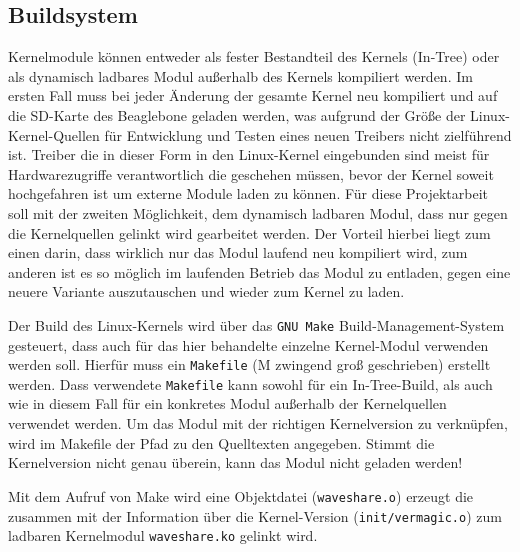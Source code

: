 \subsection{Buildsystem}
Kernelmodule können entweder als fester Bestandteil des Kernels (In-Tree) oder als dynamisch ladbares Modul außerhalb des Kernels kompiliert werden. Im ersten Fall muss bei jeder Änderung der gesamte Kernel neu kompiliert und auf die SD-Karte des Beaglebone geladen werden, was aufgrund der Größe der Linux-Kernel-Quellen für Entwicklung und Testen eines neuen Treibers nicht zielführend ist. Treiber die in dieser Form in den Linux-Kernel eingebunden sind meist für Hardwarezugriffe verantwortlich die geschehen müssen, bevor der Kernel soweit hochgefahren ist um externe Module laden zu können. %
Für diese Projektarbeit soll mit der zweiten Möglichkeit, dem dynamisch ladbaren Modul, dass nur gegen die Kernelquellen gelinkt wird gearbeitet werden. Der Vorteil hierbei liegt zum einen darin, dass wirklich nur das Modul laufend neu kompiliert wird, zum anderen ist es so möglich im laufenden Betrieb das Modul zu entladen, gegen eine neuere Variante auszutauschen und wieder zum Kernel zu laden. 

Der Build des Linux-Kernels wird über das \texttt{GNU Make} Build-Management-System gesteuert, dass auch für das hier behandelte einzelne Kernel-Modul verwenden werden soll. Hierfür muss ein \texttt{Makefile} (M zwingend groß geschrieben) erstellt werden. Dass verwendete \texttt{Makefile} kann sowohl für ein In-Tree-Build, als auch wie in diesem Fall für ein konkretes Modul außerhalb der Kernelquellen verwendet werden. Um das Modul mit der richtigen Kernelversion zu verknüpfen, wird im Makefile der Pfad zu den Quelltexten angegeben. Stimmt die Kernelversion nicht genau überein, kann das Modul nicht geladen werden! 

Mit dem Aufruf von Make wird eine Objektdatei (\texttt{waveshare.o}) erzeugt die zusammen mit der Information über die Kernel-Version (\texttt{init/vermagic.o}) zum ladbaren Kernelmodul \texttt{waveshare.ko} gelinkt wird. %

